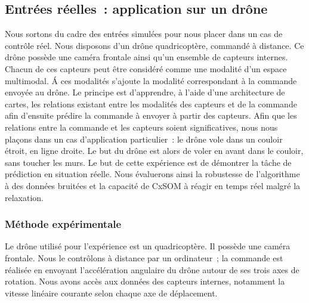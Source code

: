 \documentclass[../main]{subfiles}
\begin{document}
\subsection{Entrées réelles~: application sur un drône}

Nous sortons du cadre des entrées simulées pour nous placer dans un cas de contrôle réel. 
Nous disposons d'un drône quadricoptère, commandé à distance. Ce drône possède une caméra frontale ainsi qu'un ensemble de capteurs internes. Chacun de ces capteurs peut être considéré comme une modalité d'un espace multimodal. \'A ces modalités s'ajoute la modalité correspondant à la commande envoyée au drône.
Le principe est d'apprendre, à l'aide d'une architecture de cartes, les relations existant entre les modalités des capteurs et de la commande afin d'ensuite prédire la commande à envoyer à partir des capteurs.
Afin que les relations entre la commande et les capteurs soient significatives, nous nous plaçons dans un cas d'application particulier~: le drône vole dans un couloir étroit, en ligne droite. Le but du drône est alors de voler en avant dans le couloir, sans toucher les murs.
Le but de cette expérience est de démontrer la tâche de prédiction en situation réelle. Nous évaluerons ainsi la robustesse de l'algorithme à des données bruitées et la capacité de CxSOM à réagir en temps réel malgré la relaxation.

\subsubsection{Méthode expérimentale}

Le drône utilisé pour l'expérience est un quadricoptère. Il possède une caméra frontale.
Nous le contrôlons à distance par un ordinateur~; la commande est réalisée en envoyant l'accélération angulaire du drône autour de ses trois axes de rotation.
Nous avons accès aux données des capteurs internes, notamment la vitesse linéaire courante selon chaque axe de déplacement.
\end{document}
